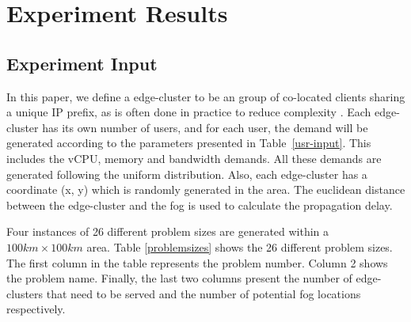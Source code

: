 \documentclass[10pt,journal,compsoc]{IEEEtran}
\begin{document}
\section{Experiment Results}\label{express}
\subsection{Experiment Input}
In this paper, we define a edge-cluster to be an group of co-located clients sharing a unique IP prefix, as is often done in practice to reduce complexity \cite{nygren2010akamai}. Each edge-cluster has its own number of users, and for each user, the demand will be generated according to the parameters presented in Table~\ref{usr-input}. This includes the vCPU, memory and bandwidth demands. All these demands are generated following the uniform distribution. Also, each edge-cluster has a coordinate (x, y) which is randomly generated in the area. The euclidean distance between the edge-cluster and the fog is used to calculate the propagation delay.
\begin{table}[h]
\centering
\caption{Edge cluster demands}
\label{usr-input}

\end{table}

Four instances of 26 different problem sizes are generated within a $100 km \times 100 km$ area. Table \ref{problemsizes} shows the 26 different problem sizes. The first column in the table represents the problem number. Column 2 shows the problem name. Finally, the last two columns present the number of edge-clusters that need to be served and the number of potential fog locations respectively. 
\end{document}
